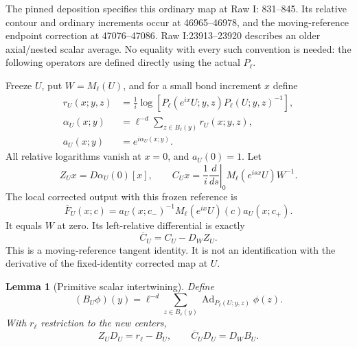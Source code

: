 \documentclass[11pt]{article}
\newtheorem{lemma}[theorem]{Lemma}
\theoremstyle{remark}
\begin{document}
The pinned deposition specifies this ordinary map at Raw I:
831--845. Its relative contour and ordinary increments occur at
46965--46978, and the moving-reference endpoint correction at
47076--47086. Raw I:23913--23920 describes an older axial/nested
scalar average. No equality with every such convention is needed:
the following operators are defined directly using the actual
\(P_\ell\).

Freeze \(U\), put \(W=M_\ell(U)\), and for a small bond increment
\(x\) define
\begin{equation}
 \begin{split}
 r_U(x;y,z)
   &=\frac1i\log\!\left[
       P_\ell(e^{ix}U;y,z)P_\ell(U;y,z)^{-1}\right],\\
 \alpha_U(x;y)&=\ell^{-d}\sum_{z\in B_\ell(y)}r_U(x;y,z),\\
 a_U(x;y)&=e^{i\alpha_U(x;y)}.
 \end{split}
 \label{ccs-relative-mean}
\end{equation}
All relative logarithms vanish at \(x=0\), and \(a_U(0)=1\).
Let
\begin{equation}
 Z_Ux=D\alpha_U(0)[x],\qquad
 C_Ux=\frac1i\left.\frac d{ds}\right|_0
                  M_\ell(e^{isx}U)W^{-1}.
 \label{ccs-tangents}
\end{equation}
The local corrected output with this frozen reference is
\[
 \overline F_U(x;c)=a_U(x;c_-)^{-1}
                         M_\ell(e^{ix}U)(c)a_U(x;c_+).
\]
It equals \(W\) at zero. Its left-relative differential is exactly
\begin{equation}
                     \overline C_U=C_U-D_WZ_U.
 \label{ccs-primitive-correction}
\end{equation}
This is a moving-reference tangent identity. It is not an
identification with the derivative of the fixed-identity corrected
map at \(U\).

\begin{lemma}[Primitive scalar intertwining]
\label{ccs-primitive-lemma}
Define
\begin{equation}
 (B_U\phi)(y)=\ell^{-d}\sum_{z\in B_\ell(y)}
                  \operatorname{Ad}_{P_\ell(U;y,z)}\phi(z).
 \label{ccs-primitive-B}
\end{equation}
With \(r_\ell\) restriction to the new centers,
\begin{equation}
 Z_UD_U=r_\ell-B_U,\qquad
                  \overline C_UD_U=D_WB_U.
 \label{ccs-primitive-intertwining}
\end{equation}
\end{lemma}
\end{document}
